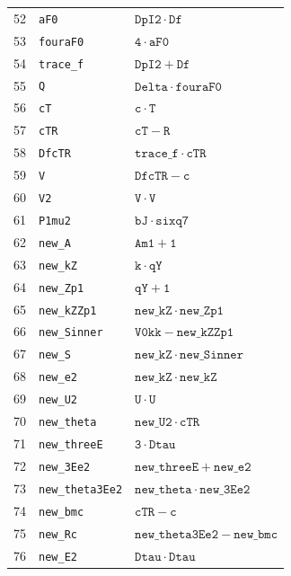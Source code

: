 \documentclass[11pt]{article}
\theoremstyle{remark}
\begin{document}
\begin{longtable}{rll}
52 & \texttt{aF0} & $\mathtt{DpI2} \mathbin{\cdot} \mathtt{Df}$ \\
53 & \texttt{fouraF0} & $\mathtt{4} \mathbin{\cdot} \mathtt{aF0}$ \\
54 & \texttt{trace\_f} & $\mathtt{DpI2} + \mathtt{Df}$ \\
55 & \texttt{Q} & $\mathtt{Delta} \mathbin{\cdot} \mathtt{fouraF0}$ \\
56 & \texttt{cT} & $\mathtt{c} \mathbin{\cdot} \mathtt{T}$ \\
57 & \texttt{cTR} & $\mathtt{cT} - \mathtt{R}$ \\
58 & \texttt{DfcTR} & $\mathtt{trace\_f} \mathbin{\cdot} \mathtt{cTR}$ \\
59 & \texttt{V} & $\mathtt{DfcTR} - \mathtt{c}$ \\
60 & \texttt{V2} & $\mathtt{V} \mathbin{\cdot} \mathtt{V}$ \\
61 & \texttt{P1mu2} & $\mathtt{bJ} \mathbin{\cdot} \mathtt{sixq7}$ \\
62 & \texttt{new\_A} & $\mathtt{Am1} + \mathtt{1}$ \\
63 & \texttt{new\_kZ} & $\mathtt{k} \mathbin{\cdot} \mathtt{qY}$ \\
64 & \texttt{new\_Zp1} & $\mathtt{qY} + \mathtt{1}$ \\
65 & \texttt{new\_kZZp1} & $\mathtt{new\_kZ} \mathbin{\cdot} \mathtt{new\_Zp1}$ \\
66 & \texttt{new\_Sinner} & $\mathtt{V0kk} - \mathtt{new\_kZZp1}$ \\
67 & \texttt{new\_S} & $\mathtt{new\_kZ} \mathbin{\cdot} \mathtt{new\_Sinner}$ \\
68 & \texttt{new\_e2} & $\mathtt{new\_kZ} \mathbin{\cdot} \mathtt{new\_kZ}$ \\
69 & \texttt{new\_U2} & $\mathtt{U} \mathbin{\cdot} \mathtt{U}$ \\
70 & \texttt{new\_theta} & $\mathtt{new\_U2} \mathbin{\cdot} \mathtt{cTR}$ \\
71 & \texttt{new\_threeE} & $\mathtt{3} \mathbin{\cdot} \mathtt{Dtau}$ \\
72 & \texttt{new\_3Ee2} & $\mathtt{new\_threeE} + \mathtt{new\_e2}$ \\
73 & \texttt{new\_theta3Ee2} & $\mathtt{new\_theta} \mathbin{\cdot} \mathtt{new\_3Ee2}$ \\
74 & \texttt{new\_bmc} & $\mathtt{cTR} - \mathtt{c}$ \\
75 & \texttt{new\_Rc} & $\mathtt{new\_theta3Ee2} - \mathtt{new\_bmc}$ \\
76 & \texttt{new\_E2} & $\mathtt{Dtau} \mathbin{\cdot} \mathtt{Dtau}$ \\

\end{longtable}
\end{document}
